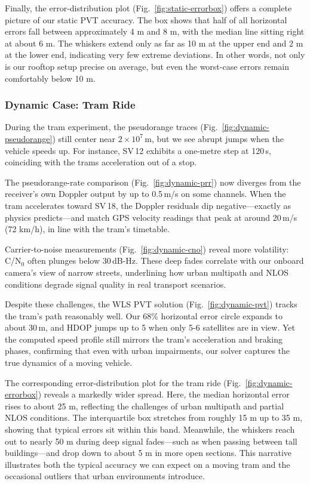             Finally, the error-distribution plot (Fig.~\ref{fig:static-errorbox}) offers a complete picture of our static PVT accuracy. 
            The box shows that half of all horizontal errors fall between approximately 4 m and 8 m, with the median line sitting right at about 6 m. 
            The whiskers extend only as far as 10 m at the upper end and 2 m at the lower end, indicating very few extreme deviations. 
            In other words, not only is our rooftop setup precise on average, but even the worst-case errors remain comfortably below 10 m.

        \subsubsection{Dynamic Case: Tram Ride}
        
            During the tram experiment, the pseudorange traces (Fig.~\ref{fig:dynamic-pseudorange}) still center near $2\times10^{7}$\,m, but we see abrupt jumps when the vehicle speeds up. 
            For instance, SV\,12 exhibits a one-metre step at 120\,s, coinciding with the trams acceleration out of a stop.

            The pseudorange-rate comparison (Fig.~\ref{fig:dynamic-prr}) now diverges from the receiver's own Doppler output by up to 0.5\,m/s on some channels. 
            When the tram accelerates toward SV\,18, the Doppler residuals dip negative—exactly as physics predicts—and match GPS velocity readings that peak at around 20\,m/s (72 km/h), in line with the tram's timetable.

            Carrier-to-noise measurements (Fig.~\ref{fig:dynamic-cno}) reveal more volatility: C/N$_0$ often plunges below 30\,dB-Hz. 
            These deep fades correlate with our onboard camera's view of narrow streets, underlining how urban multipath and NLOS conditions degrade signal quality in real transport scenarios.

            Despite these challenges, the WLS PVT solution (Fig.~\ref{fig:dynamic-pvt}) tracks the tram's path reasonably well. 
            Our 68\% horizontal error circle expands to about 30\,m, and HDOP jumps up to 5 when only 5-6 satellites are in view. 
            Yet the computed speed profile still mirrors the tram's acceleration and braking phases, confirming that even with urban impairments, our solver captures the true dynamics of a moving vehicle.

            The corresponding error-distribution plot for the tram ride (Fig.~\ref{fig:dynamic-errorbox}) reveals a markedly wider spread. 
            Here, the median horizontal error rises to about 25 m, reflecting the challenges of urban multipath and partial NLOS conditions. 
            The interquartile box stretches from roughly 15 m up to 35 m, showing that typical errors sit within this band. 
            Meanwhile, the whiskers reach out to nearly 50 m during deep signal fades—such as when passing between tall buildings—and drop down to about 5 m in more open sections. 
            This narrative illustrates both the typical accuracy we can expect on a moving tram and the occasional outliers that urban environments introduce.


